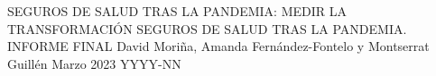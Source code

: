 \documentclass[12pt,twoside]{article} %
\begin{document}
\buecedefinitions%
        {SEGUROS DE SALUD TRAS LA PANDEMIA: MEDIR LA TRANSFORMACIÓN}
        {SEGUROS DE SALUD TRAS LA PANDEMIA. INFORME FINAL}
        {David Moriña, Amanda Fernández-Fontelo y Montserrat Guillén}
        {Marzo 2023}
        {YYYY-NN} %

\buecereporttitleboxpage

\buecereporttitlepage

\end{document}
